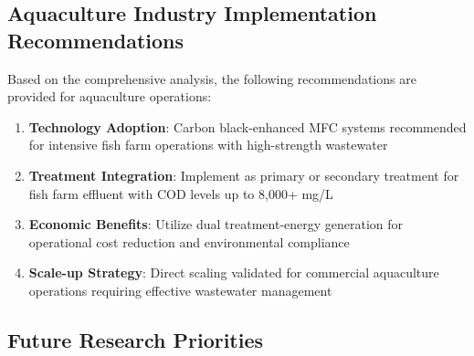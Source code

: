 \documentclass[12pt,a4paper]{article}
\begin{document}
\subsection{Aquaculture Industry Implementation Recommendations}

Based on the comprehensive analysis, the following recommendations are provided for aquaculture operations:

\begin{enumerate}
    \item \textbf{Technology Adoption}: Carbon black-enhanced MFC systems recommended for intensive fish farm operations with high-strength wastewater
    
    \item \textbf{Treatment Integration}: Implement as primary or secondary treatment for fish farm effluent with COD levels up to 8,000+ mg/L
    
    \item \textbf{Economic Benefits}: Utilize dual treatment-energy generation for operational cost reduction and environmental compliance
    
    \item \textbf{Scale-up Strategy}: Direct scaling validated for commercial aquaculture operations requiring effective wastewater management
\end{enumerate}

\subsection{Future Research Priorities}
\end{document}
